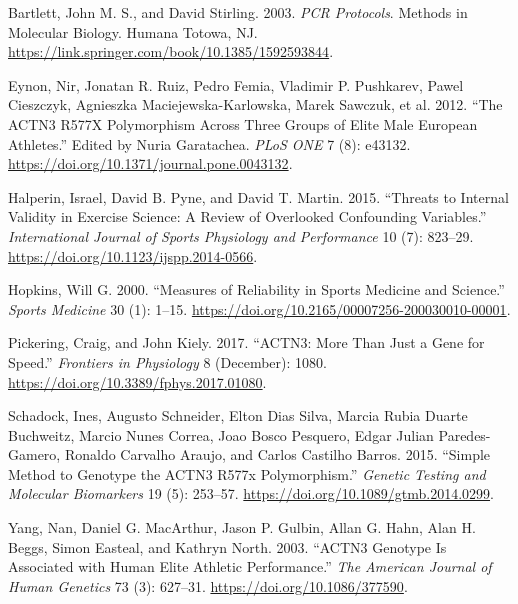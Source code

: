\documentclass[
  letterpaper,
  DIV=11,
  numbers=noendperiod]{scrreprt}
\newlength{\cslhangindent}
\newlength{\cslentryspacingunit} %
\newenvironment{CSLReferences}[2] %
 {%
  \setlength{\parindent}{0pt}
  \ifodd #1
  \let\oldpar\par
  \def\par{\hangindent=\cslhangindent\oldpar}
  \fi
  \setlength{\parskip}{#2\cslentryspacingunit}
 }%
 {}
\begin{document}
\hypertarget{refs}{}
\begin{CSLReferences}{1}{0}
\leavevmode{}%
Bartlett, John M. S., and David Stirling. 2003. \emph{PCR Protocols}.
Methods in Molecular Biology. Humana Totowa, NJ.
\url{https://link.springer.com/book/10.1385/1592593844}.

\leavevmode{}%
Eynon, Nir, Jonatan R. Ruiz, Pedro Femia, Vladimir P. Pushkarev, Pawel
Cieszczyk, Agnieszka Maciejewska-Karlowska, Marek Sawczuk, et al. 2012.
{``The ACTN3 R577X Polymorphism Across Three Groups of Elite Male
European Athletes.''} Edited by Nuria Garatachea. \emph{PLoS ONE} 7 (8):
e43132. \url{https://doi.org/10.1371/journal.pone.0043132}.

\leavevmode{}%
Halperin, Israel, David B. Pyne, and David T. Martin. 2015. {``Threats
to Internal Validity in Exercise Science: A Review of Overlooked
Confounding Variables.''} \emph{International Journal of Sports
Physiology and Performance} 10 (7): 823--29.
\url{https://doi.org/10.1123/ijspp.2014-0566}.

\leavevmode{}%
Hopkins, Will G. 2000. {``Measures of Reliability in Sports Medicine and
Science.''} \emph{Sports Medicine} 30 (1): 1--15.
\url{https://doi.org/10.2165/00007256-200030010-00001}.

\leavevmode{}%
Pickering, Craig, and John Kiely. 2017. {``ACTN3: More Than Just a Gene
for Speed.''} \emph{Frontiers in Physiology} 8 (December): 1080.
\url{https://doi.org/10.3389/fphys.2017.01080}.

\leavevmode{}%
Schadock, Ines, Augusto Schneider, Elton Dias Silva, Marcia Rubia Duarte
Buchweitz, Marcio Nunes Correa, Joao Bosco Pesquero, Edgar Julian
Paredes-Gamero, Ronaldo Carvalho Araujo, and Carlos Castilho Barros.
2015. {``Simple Method to Genotype the ACTN3 R577x Polymorphism.''}
\emph{Genetic Testing and Molecular Biomarkers} 19 (5): 253--57.
\url{https://doi.org/10.1089/gtmb.2014.0299}.

\leavevmode{}%
Yang, Nan, Daniel G. MacArthur, Jason P. Gulbin, Allan G. Hahn, Alan H.
Beggs, Simon Easteal, and Kathryn North. 2003. {``ACTN3 Genotype Is
Associated with Human Elite Athletic Performance.''} \emph{The American
Journal of Human Genetics} 73 (3): 627--31.
\url{https://doi.org/10.1086/377590}.

\end{CSLReferences}
\end{document}
